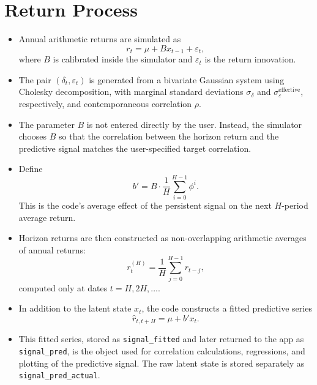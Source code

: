 \documentclass[11pt]{article}
\begin{document}
\section*{Return Process}
\begin{itemize}
\item Annual arithmetic returns are simulated as
\[
r_t = \mu + B x_{t-1} + \varepsilon_t,
\]
where \(B\) is calibrated inside the simulator and \(\varepsilon_t\) is the return innovation.
\item The pair \((\delta_t,\varepsilon_t)\) is generated from a bivariate Gaussian system using Cholesky decomposition, with marginal standard deviations \(\sigma_{\delta}\) and \(\sigma_{\varepsilon}^{\mathrm{effective}}\), respectively, and contemporaneous correlation \(\rho\).
\item The parameter \(B\) is not entered directly by the user. Instead, the simulator chooses \(B\) so that the correlation between the horizon return and the predictive signal matches the user-specified target correlation.
\item Define
\[
b' = B \cdot \frac{1}{H}\sum_{i=0}^{H-1}\phi^i.
\]
This is the code's average effect of the persistent signal on the next \(H\)-period average return.
\item Horizon returns are then constructed as non-overlapping arithmetic averages of annual returns:
\[
r_t^{(H)} = \frac{1}{H}\sum_{j=0}^{H-1} r_{t-j},
\]
computed only at dates \(t = H, 2H, \dots\).
\item In addition to the latent state \(x_t\), the code constructs a fitted predictive series
\[
\hat r_{t,t+H} = \mu + b' x_t.
\]
\item This fitted series, stored as \texttt{signal\_fitted} and later returned to the app as \texttt{signal\_pred}, is the object used for correlation calculations, regressions, and plotting of the predictive signal. The raw latent state is stored separately as \texttt{signal\_pred\_actual}.
\end{itemize}
\end{document}
